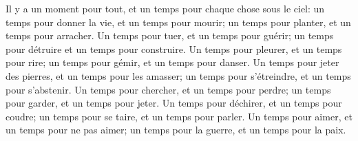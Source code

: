 Il y a un moment pour tout, et un temps pour chaque chose sous le ciel:
	un temps pour donner la vie, et un temps pour mourir;
	un temps pour planter, et un temps pour arracher.
Un temps pour tuer, et un temps pour guérir;
	un temps pour détruire et un temps pour construire.
Un temps pour pleurer, et un temps pour rire;
	un temps pour gémir, et un temps pour danser.
Un temps pour jeter des pierres, et un temps pour les amasser;
	un temps pour s’étreindre, et un temps pour s’abstenir.
Un temps pour chercher, et un temps pour perdre;
	un temps pour garder, et un temps pour jeter.
Un temps pour déchirer, et un temps pour coudre;
	un temps pour se taire, et un temps pour parler.
Un temps pour aimer, et un temps pour ne pas aimer;
	un temps pour la guerre, et un temps pour la paix.

